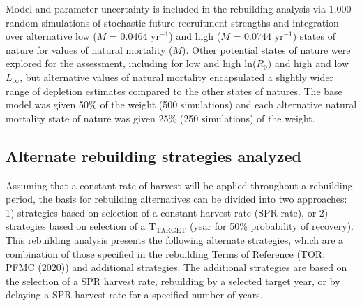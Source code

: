 \documentclass[11pt,
  english,
  letterpaper,
]{article}
\begin{document}
\leavevmode\tagmcend\tagstructend


Model and parameter uncertainty is included in the rebuilding analysis via 1,000 random simulations of stochastic future recruitment strengths and integration over alternative low ({\(M\)\leavevmode\tagmcend\tagstructend} = 0.0464 yr{\(^{-1}\)\leavevmode\tagmcend\tagstructend}) and high ({\(M\)\leavevmode\tagmcend\tagstructend} = 0.0744 yr{\(^{-1}\)\leavevmode\tagmcend\tagstructend}) states of nature for values of natural mortality ({\(M\)\leavevmode\tagmcend\tagstructend}). Other potential states of nature were explored for the assessment, including for low and high ln({\(R_0\)\leavevmode\tagmcend\tagstructend}) and high and low {\(L_{\infty}\)\leavevmode\tagmcend\tagstructend}, but alternative values of natural mortality encapsulated a slightly wider range of depletion estimates compared to the other states of natures. The base model was given 50\% of the weight (500 simulations) and each alternative natural mortality state of nature was given 25\% (250 simulations) of the weight.

\leavevmode\tagmcend\tagstructend\par


\hypertarget{alternate-rebuilding-strategies-analyzed}{%
\subsection{Alternate rebuilding strategies analyzed}\label{alternate-rebuilding-strategies-analyzed}}

\leavevmode\tagmcend\tagstructend


Assuming that a constant rate of harvest will be applied throughout a rebuilding period, the basis for rebuilding alternatives can be divided into two approaches: 1) strategies based on selection of a constant harvest rate (SPR rate), or 2) strategies based on selection of a {\(\text{T}_\text{TARGET}\)\leavevmode\tagmcend\tagstructend} (year for 50\% probability of recovery). This rebuilding analysis presents the following alternate strategies, which are a combination of those specified in the rebuilding Terms of Reference (TOR; PFMC {(2020)\leavevmode\tagmcend\tagstructend}) and additional strategies. The additional strategies are based on the selection of a SPR harvest rate, rebuilding by a selected target year, or by delaying a SPR harvest rate for a specified number of years.
\end{document}
